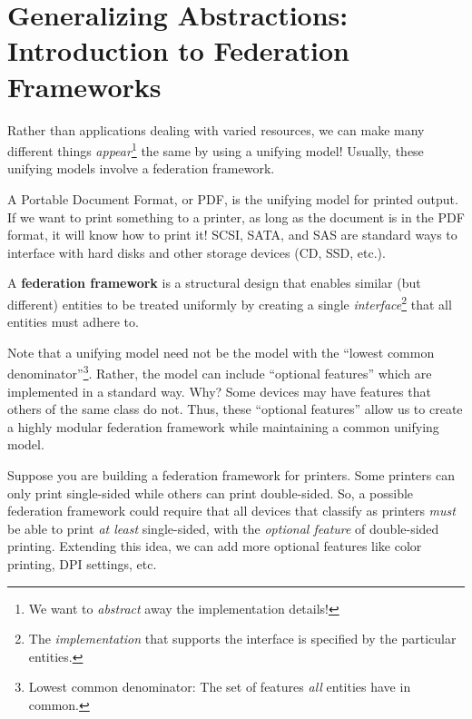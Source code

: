 \documentclass{report}
\begin{document}
\section{Generalizing Abstractions: Introduction to Federation Frameworks}
Rather than applications dealing with varied resources, we can make many different things
\textit{appear}\footnote{We want to \textit{abstract} away the implementation details!} the same by
using a unifying model! Usually, these unifying models involve a federation framework.

\begin{tcolorbox}[colback=blue!5!white,colframe=black!75!blue,title=Example: Computer Communism] 
  A Portable Document Format, or PDF, is the unifying model for printed output. If we want to print
  something to a printer, as long as the document is in the PDF format, it will know how to print it!
  \tcblower
  SCSI, SATA, and SAS are standard ways to interface with hard disks and other storage devices (CD,
  SSD, etc.).
\end{tcolorbox}

\begin{tcolorbox}[title=Definition: Federation Framework]
  A \textbf{federation framework} is a structural design that enables similar (but different)
  entities to be treated uniformly by creating a single \textit{interface}\footnote{The
    \textit{implementation} that supports the interface is specified by the particular entities.}
  that all entities must adhere to. 
\end{tcolorbox}

Note that a unifying model need not be the model with the ``lowest common
denominator''\footnote{Lowest common denominator: The set of features \textit{all} entities have in
  common.}. Rather, the model can include ``optional features'' which are implemented in a standard
way. Why? Some devices may have features that others of the same class do not. Thus, these
``optional features'' allow us to create a highly modular federation framework while maintaining a
common unifying model.

\begin{tcolorbox}[colback=blue!5!white,colframe=black!75!blue,title=Example: Pretty Printing] 
  Suppose you are building a federation framework for printers. Some printers can only print
  single-sided while others can print double-sided. So, a possible federation framework 
  could require that all devices that classify as printers \textit{must} be able to print \textit{at
    least} single-sided, with the \textit{optional feature} of double-sided printing. Extending this
  idea, we can add more optional features like color printing, DPI settings, etc.
\end{tcolorbox}
\end{document}
